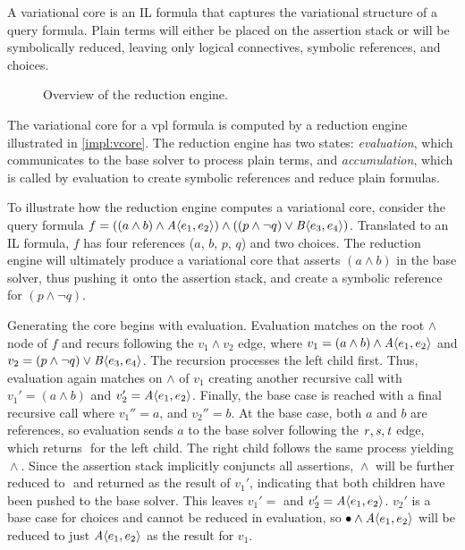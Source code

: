 \label{section:vsat:vcore}
%
A variational core is an IL formula that captures the variational structure of
a query formula. Plain terms will either be placed on the assertion stack or
will be symbolically reduced, leaving only logical connectives, symbolic
references, and choices.

\begin{figure}
  \centering
    
    \caption{Overview of the reduction engine.}%
    \label{impl:vcore}
\end{figure}


The variational core for a \ac{vpl} formula is computed by a reduction engine
illustrated in \autoref{impl:vcore}. The reduction engine has two states:
\emph{evaluation}, which communicates to the base solver to process plain terms,
and \emph{accumulation}, which is called by evaluation to create symbolic
references and reduce plain formulas.


To illustrate how the reduction engine computes a variational core, consider the
query formula $f = ((a \wedge b) \wedge \chc[A]{e_{1}, e_{2}}) \wedge ((p \wedge
\neg q) \vee \chc[B]{e_{3}, e_{4}})$. Translated to an IL formula, $f$ has four
references ($a$, $b$, $p$, $q$) and two choices. The reduction engine will
ultimately produce a variational core that asserts $(a \wedge b)$ in the base
solver, thus pushing it onto the assertion stack, and create a symbolic
reference for $(p \wedge \neg q)$.

Generating the core begins with evaluation. Evaluation matches on the root
$\wedge$ node of $f$ and recurs following the $v_1 \wedge v_2$ edge, where
%
$v_1=(a\wedge b)\wedge\chc[A]{e_1,e_2}$ and
$v_2=(p\wedge \neg q) \vee \chc[B]{e_3, e_4}$.
%
The recursion processes the left child first. Thus, evaluation again matches on
$\wedge$ of $v_{1}$ creating another recursive call with $v_{1}' = (a\wedge b)$
and $v_{2}' = \chc[A]{e_1,e_2}$. Finally, the base case is reached with a final
recursive call where $v_{1}'' = a$, and $v_{2}'' = b$. At the base case, both
$a$ and $b$ are references, so evaluation sends $a$ to the base solver
following the $\mathit{r, s, t}$ edge, which returns $\unit{}$ for the left child.
The right child follows the same process yielding $\unit{} \wedge \unit{}$.
Since the assertion stack implicitly conjuncts all assertions, $\unit{} \wedge
\unit{}$ will be further reduced to $\unit{}$ and returned as the result of
$v_{1}'$, indicating that both children have been pushed to the base solver.
This leaves $v_{1}' = \unit{}$ and $v_{2}' = \chc[A]{e_1,e_2}$. $v_{2}'$ is a
base case for choices and cannot be reduced in evaluation, so $\unit{} \wedge
\chc[A]{e_1,e_2}$ will be reduced to just $\chc[A]{e_1,e_2}$ as the result for
$v_{1}$.

